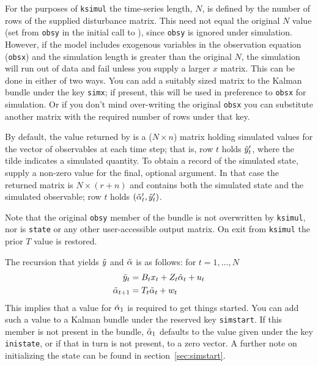 For the purposes of \texttt{ksimul} the time-series length, $N$, is
defined by the number of rows of the supplied disturbance matrix. This
need not equal the original $N$ value (set from \texttt{obsy} in the
initial call to ), since \texttt{obsy} is ignored under
simulation. However, if the model includes exogenous variables in the
observation equation (\texttt{obsx}) and the simulation length is
greater than the original $N$, the simulation will run out of data and
fail unless you supply a larger $x$ matrix.  This can be done in
either of two ways. You can add a suitably sized matrix to the Kalman
bundle under the key \texttt{simx}; if present, this will be used in
preference to \texttt{obsx} for simulation. Or if you don't mind
over-writing the original \texttt{obsx} you can substitute another
matrix with the required number of rows under that key.

By default, the value returned by  is a ($N \times n$)
matrix holding simulated values for the vector of observables at each
time step; that is, row $t$ holds $\tilde{y}_t'$, where the tilde
indicates a simulated quantity.  To obtain a record of the simulated
state, supply a non-zero value for the final, optional argument. In
that case the returned matrix is $N \times (r+n)$ and contains both
the simulated state and the simulated observable; row $t$ holds
$(\tilde{\alpha}_t', \tilde{y}_t')$.

Note that the original \texttt{obsy} member of the bundle is not
overwritten by \texttt{ksimul}, nor is \texttt{state} or any other
user-accessible output matrix. On exit from \texttt{ksimul} the prior
$T$ value is restored.

The recursion that yields $\tilde{y}$ and $\tilde{\alpha}$
is as follows: for $t=1,\dots,N$
%
\begin{align*}
  \tilde{y}_t &= B_tx_t +
   Z_t \tilde{\alpha}_t + u_t  \\
  \tilde{\alpha}_{t+1} &= T_t \tilde{\alpha}_t + w_t
\end{align*}
%
This implies that a value for $\tilde{\alpha}_1$ is required to get
things started. You can add such a value to a Kalman bundle under the
reserved key \texttt{simstart}. If this member is not present in the
bundle, $\tilde{\alpha}_1$ defaults to the value given under the
key \texttt{inistate}, or if that in turn is not present, to a zero
vector. A further note on initializing the state can be found in
section~\ref{sec:simstart}.


